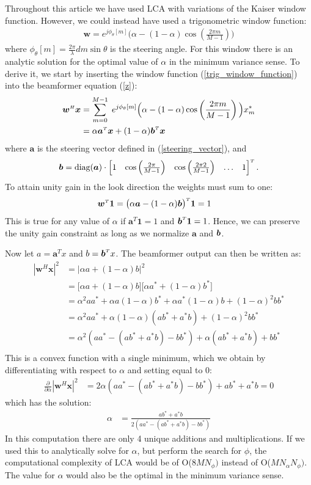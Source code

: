 \documentclass[10pt,journal,draftclsnofoot,onecolumn]{IEEEtran}
\newcommand\nn{\nonumber\\}
\newcommand\sumb[2]{\sum\limits_{#1}^{#2}\;}
\newcommand\T{^{\scriptscriptstyle T}}
\renewcommand\H{^{\scriptscriptstyle H}}
\renewcommand\vec[1]{\boldsymbol{#1}}
\newcommand\1{\vec 1}
\renewcommand*\a{\vec a}
\newcommand*\w{\vec w}
\newcommand*\x{\vec x}
\begin{document}
Throughout this article we have used LCA with variations of the Kaiser window function. However, we could instead have used a trigonometric window function:
%
\begin{align}
\w = e^{j\phi_\theta[m]}\big(\alpha - (1-\alpha)\cos\left(\frac{2\pi m}{M-1}\right)\big)\label{trig_window_function}
\end{align}
%
where $\phi_\theta[m] = \frac{2\pi}{\lambda}dm\sin\theta$ is the steering angle. For this window there is an analytic solution for the optimal value of $\alpha$ in the minimum variance sense. To derive it, we start by inserting the window function (\ref{trig_window_function}) into the beamformer equation (\ref{z}):
%
\begin{align}
\w\H\x &= \sumb{m=0}{M-1} e^{j\phi_\theta[m]}\Big(\alpha - (1-\alpha)\cos\left(\frac{2\pi m}{M-1}\right)\Big) x_m^* \nn
&= \alpha \a\T\x + (1-\alpha)\b\T\x
\end{align}
%
where $\a$ is the steering vector defined in (\ref{steering_vector}), and 
%
\begin{align}
\b = \text{diag}(\a)\cdot\begin{bmatrix}
     1 &
     \cos\left(\frac{2\pi}{M-1}\right) &
     \cos\left(\frac{2\pi 2}{M-1}\right) &
     \hdots &
     1
     \end{bmatrix}\T.
\end{align}
%
To attain unity gain in the look direction the weights must sum to one:
%
\begin{align}
\w\T\1 &= \big(\alpha\a - (1-\alpha)\b\big)\T\1 = 1
\end{align}
%
This is true for any value of $\alpha$ if $\a\T\1 = 1$ and $\b\T\1 = 1$. Hence, we can preserve the unity gain constraint as long as we normalize $\a$ and $\b$.

Now let $a=\a\T x$ and $b=\b\T x$. The beamformer output can then be written as:
%
\begin{align}
|\w\H\x|^2 &= \Big| \alpha a + (1-\alpha)b \Big|^2 \nn
&= \Big[\alpha a + (1-\alpha)b\Big] \Big[\alpha a^* + (1-\alpha)b^*\Big] \nn
&= \alpha^2 aa^* + \alpha a(1-\alpha)b^* + \alpha a^*(1-\alpha)b + (1-\alpha)^2bb^* \nn
&= \alpha^2 aa^* + \alpha(1-\alpha)(ab^* + a^*b) + (1-\alpha)^2bb^* \nn
&= \alpha^2 (aa^* - (ab^* + a^*b) - bb^*) + \alpha(ab^* + a^*b) + bb^* \nn
\end{align}
%
This is a convex function with a single minimum, which we obtain by differentiating with respect to $\alpha$ and setting equal to 0:
%
\begin{align}
\frac{\partial}{\partial\alpha} |\w\H\x|^2 
&= 2\alpha (aa^* - (ab^* + a^*b) - bb^*) + ab^* + a^*b = 0
\end{align}
%
which has the solution:
%
\begin{align}
\alpha &= \frac{ab^* + a^*b}{2(aa^* - (ab^* + a^*b) - bb^*)}
\end{align}
%
In this computation there are only 4 unique additions and multiplications. If we used this to analytically solve for $\alpha$, but perform the search for $\phi$, the computational complexity of LCA would be of O($8MN_\phi)$ instead of O($MN_\alpha N_\phi)$. The value for $\alpha$ would also be the optimal in the minimum variance sense.
\end{document}
